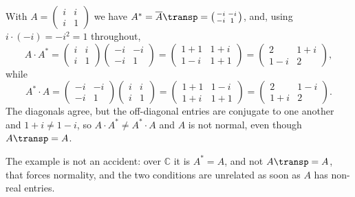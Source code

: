 \begin{exercisesolution}
\label{sol:symmetric_not_normal}
With $A = \left(\begin{smallmatrix} i & i \\ i & 1 \end{smallmatrix}\right)$ we have $A^* = \overline{A}\transp = \left(\begin{smallmatrix} -i & -i \\ -i & 1 \end{smallmatrix}\right)$, and, using $i \cdot (-i) = -i^2 = 1$ throughout,
\[
    A \cdot A^* = \begin{pmatrix} i & i \\ i & 1 \end{pmatrix} \begin{pmatrix} -i & -i \\ -i & 1 \end{pmatrix} = \begin{pmatrix} 1 + 1 & 1 + i \\ 1 - i & 1 + 1 \end{pmatrix} = \begin{pmatrix} 2 & 1+i \\ 1-i & 2 \end{pmatrix},
\]
while
\[
    A^* \cdot A = \begin{pmatrix} -i & -i \\ -i & 1 \end{pmatrix} \begin{pmatrix} i & i \\ i & 1 \end{pmatrix} = \begin{pmatrix} 1 + 1 & 1 - i \\ 1 + i & 1 + 1 \end{pmatrix} = \begin{pmatrix} 2 & 1-i \\ 1+i & 2 \end{pmatrix}.
\]
The diagonals agree, but the off-diagonal entries are conjugate to one another and $1 + i \neq 1 - i$, so $A \cdot A^* \neq A^* \cdot A$ and $A$ is not normal, even though $A\transp = A$.

The example is not an accident: over $\mathbb{C}$ it is $A^* = A$, and not $A\transp = A$, that forces normality, and the two conditions are unrelated as soon as $A$ has non-real entries.
\end{exercisesolution}

